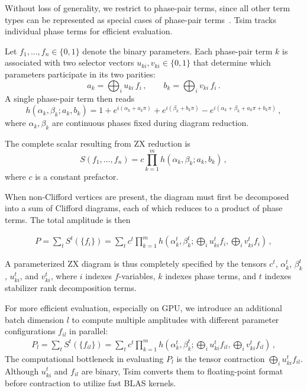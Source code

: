 \documentclass[
  a4paper,
  onecolumn,
  11pt,
  allowtoday
]{quantumarticle}
\begin{document}
Without loss of generality, we restrict to phase-pair terms, since all other term types can be represented as special cases of phase-pair terms~\cite{Sutcliffe_2025}. Tsim tracks individual phase terms for efficient evaluation.

Let $f_1, \ldots, f_n \in \{0,1\}$ denote the binary parameters. Each phase-pair term $k$ is associated with two selector vectors $u_{ki}, v_{ki} \in \{0,1\}$ that determine which parameters participate in its two parities:
\begin{equation}
  a_k = \bigoplus_{i} u_{ki} \, f_i \,,\qquad
  b_k = \bigoplus_{i} v_{ki} \, f_i \,.
  \label{eqn:parities}
\end{equation}
A single phase-pair term then reads
\begin{equation}
  h(\alpha_k, \beta_k; a_k, b_k)
  = 1 + e^{i(\alpha_k + a_k\pi)}
  + e^{i(\beta_k + b_k\pi)}
  - e^{i(\alpha_k + \beta_k + a_k\pi + b_k\pi)}\,,
  \label{eqn:phase_pair}
\end{equation}
where $\alpha_k, \beta_k$ are continuous phases fixed during diagram reduction.

The complete scalar resulting from ZX reduction is
\begin{equation}
  S(f_1,\ldots,f_n) = c \prod_{k=1}^{m} h(\alpha_k, \beta_k; a_k, b_k)\,,
  \label{eqn:scalar_product}
\end{equation}
where $c$ is a constant prefactor.

When non-Clifford vertices are present, the diagram must first be decomposed into a sum of Clifford diagrams, each of which reduces to a product of phase terms. The total amplitude is then

\begin{align}
  P = \sum_t S^{t}(\{f_i\}) =\sum_t c^{t} \prod_{k=1}^{m} h(\alpha_k^{t}, \beta_k^{t}; \bigoplus_{i} u_{ki}^t f_i, \bigoplus_{i} v_{ki}^t f_i)\,,
\end{align}

A parameterized ZX diagram is thus completely specified by the tensors
$c^t$, $\alpha_k^t$, $\beta_k^t$, $u_{ki}^t$, and $v_{ki}^t$,
where $i$ indexes $f$-variables, $k$ indexes phase terms, and $t$ indexes stabilizer rank decomposition terms.

For more efficient evaluation, especially on GPU, we introduce an additional batch dimension $l$ to compute multiple amplitudes with different parameter configurations $f_{il}$ in parallel:
\begin{align}
  P_l = \sum_t S^{t}(\{f_{il}\}) =\sum_t c^{t} \prod_{k=1}^{m} h(\alpha_k^{t}, \beta_k^{t}; \bigoplus_{i} u_{ki}^t f_{il}, \bigoplus_{i} v_{ki}^t f_{il})\,,
\end{align}
The computational bottleneck in evaluating $P_l$ is the tensor contraction $\bigoplus_{i} u_{ki}^t f_{il}$. Although $u_{ki}^t$
and $f_{il}$ are binary, Tsim converts them to floating-point format before contraction to utilize fast BLAS kernels.
\end{document}
